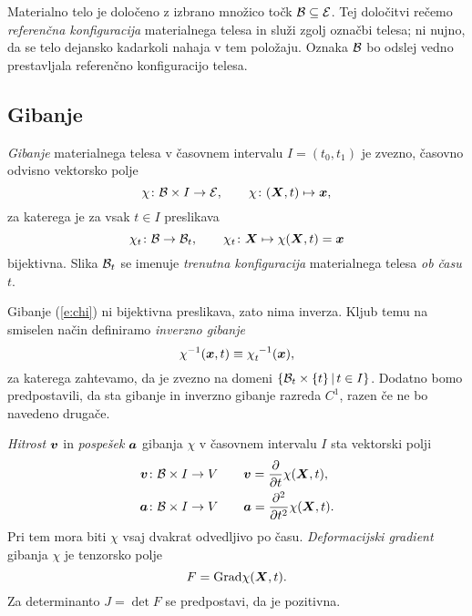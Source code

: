 Materialno telo je določeno z izbrano množico točk $\mathcal B\subseteq\mathcal E$. Tej določitvi rečemo
\emph{referenčna konfiguracija} materialnega telesa in služi zgolj označbi telesa; ni nujno,
da se telo dejansko kadarkoli nahaja v tem položaju. Oznaka $\mathcal B$ bo odslej vedno prestavljala
referenčno konfiguracijo telesa.


\subsection{Gibanje}


\begin{definicija}
	\emph{Gibanje} materialnega telesa v časovnem
	intervalu $I=(t_0,t_1)$ je zvezno, časovno odvisno vektorsko polje
	\begin{equation}\label{e:chi}
		\chi\colon\mathcal B\times I\to\mathcal E,\qquad \chi\colon (\boldsymbol X,t)\mapsto\boldsymbol x,
	\end{equation}
	za katerega je za vsak $t\in I$ preslikava
	\[ \chi_t\colon\mathcal B\to\mathcal B_t, \qquad \chi_t\colon\boldsymbol X\mapsto\chi(\boldsymbol X,t)=\boldsymbol x \]
	bijektivna. Slika $\mathcal B_t$ se imenuje \emph{trenutna konfiguracija} materialnega
	telesa \emph{ob času} $t$.
\end{definicija}
Gibanje (\ref{e:chi}) ni bijektivna preslikava, zato nima inverza. Kljub temu na smiselen
način definiramo \emph{inverzno gibanje}
\[ \chi^{-1}(\vek{x},t)\equiv\bottop{\chi}{t}{-1}(\vek{x}), \]
za katerega zahtevamo, da je zvezno na domeni $\{\mathcal B_t\times\{t\}\,|\,t\in I\}$.
Dodatno bomo predpostavili, da sta gibanje in inverzno gibanje razreda $C^1$, razen če ne bo navedeno drugače.


\emph{Hitrost} $\boldsymbol v$ in \emph{pospešek} $\boldsymbol a$ gibanja $\chi$ v časovnem intervalu $I$ sta vektorski polji
\begin{align}
	\boldsymbol v\colon\mathcal B\times I\to V \qquad & \boldsymbol v = \frac{\partial}{\partial t}\chi(\boldsymbol X,t), \label{e:v} \\
	\boldsymbol a\colon\mathcal B\times I\to V \qquad & \boldsymbol a = \frac{\partial^2}{\partial t^2}\chi(\boldsymbol X,t). \label{e:a}
\end{align}
Pri tem mora biti $\chi$ vsaj dvakrat odvedljivo po času. \emph{Deformacijski gradient} gibanja $\chi$ je
tenzorsko polje
\begin{equation} \label{e:F} F=\mathrm{Grad}\chi(\boldsymbol X,t). \end{equation}
Za determinanto $J=\det F$ se predpostavi, da je pozitivna.


